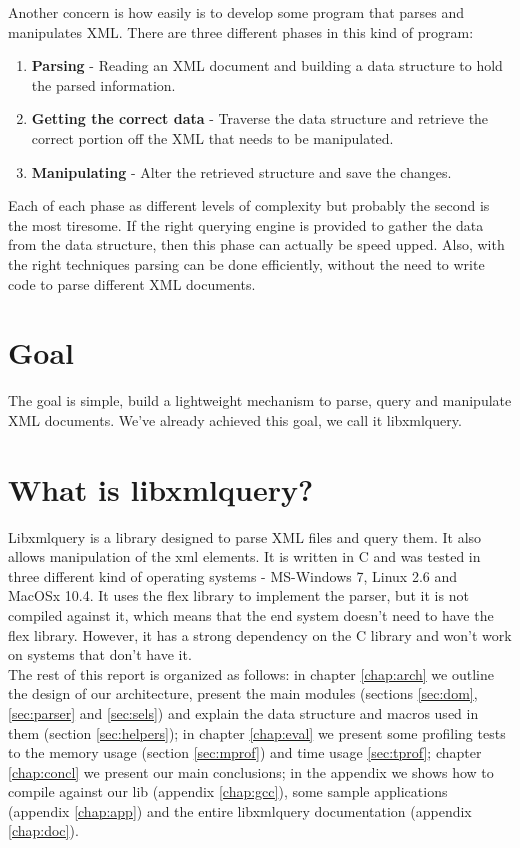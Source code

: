 \documentclass[a4paper]{report}
\begin{document}
	Another concern is how easily is to develop some program that parses and manipulates XML. There are three different phases in this kind of program:
	
	\begin{enumerate}
		\item \textbf{Parsing} - Reading an XML document and building a data structure to hold the parsed information.
		\item \textbf{Getting the correct data} - Traverse the data structure and retrieve the correct portion off the XML that needs to be manipulated.
		\item \textbf{Manipulating} - Alter the retrieved structure and save the changes.
	\end{enumerate}
	
	Each of each phase as different levels of complexity but probably the second is the most tiresome. If the right querying engine is provided to gather the data from the data structure, then this phase can actually be speed 		upped. Also, with the right techniques parsing can be done efficiently, without the need to write code to parse different XML documents.
	
\section{Goal}
	The goal is simple, build a lightweight mechanism to parse, query and manipulate XML documents. We've already achieved this goal, we call it libxmlquery.
	
\section{What is libxmlquery?}
	Libxmlquery is a library designed to parse XML files and query them. It also allows manipulation of the xml elements. It is written in C and was tested in three different kind of operating systems - MS-Windows 7, Linux 2.6 
	and MacOSx 10.4. It uses the flex library to implement the parser, but it is not compiled against it, which means that the end system doesn't need to have the flex library. However, it has a strong dependency on the C library
	and won't work on systems that don't have it.\\
	
	
	The rest of this report is organized as follows: in chapter \ref{chap:arch} we outline the design of our architecture, present the main modules (sections \ref{sec:dom}, \ref{sec:parser} and \ref{sec:sels}) and explain the data 
	structure and macros used in them (section \ref{sec:helpers}); in chapter \ref{chap:eval} we present some profiling tests to the memory usage (section \ref{sec:mprof}) and time usage \ref{sec:tprof}; chapter 
	\ref{chap:concl} we present our main conclusions; in the appendix we shows how to compile against our lib (appendix \ref{chap:gcc}), some sample applications (appendix \ref{chap:app}) and the entire libxmlquery 
	documentation (appendix \ref{chap:doc}).
\end{document}
